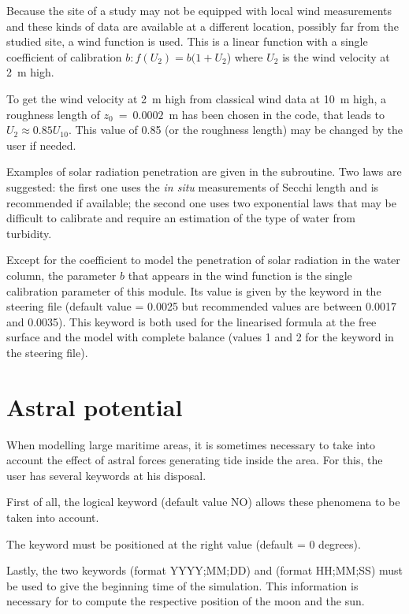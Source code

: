 Because the site of a study may not be equipped with local wind measurements
and these kinds of data are available at a different location, possibly far
from the studied site, a wind function is used. This is a linear function with
a single coefficient of calibration $b:f(U_{2}) = b(1+U_{2}$) where $U_{2}$ is
the wind velocity at 2~m high.

To get the wind velocity at 2~m high from classical wind data at 10~m high, a
roughness length of ${z}_{0}~=~0.0002$~m has been chosen in the code,
that leads to $U_{2} \approx 0.85 U_{10}$. This value
of 0.85 (or the roughness length) may be changed by the user if needed.

Examples of solar radiation penetration are given in the
 subroutine. Two laws are suggested: the first one
uses the \emph{in situ} measurements of Secchi length and is
recommended if available; the second one uses two exponential laws that may be
difficult to calibrate and require an estimation of the type of water from
turbidity.

Except for the coefficient to model the penetration of solar radiation in the
water column, the parameter $b$ that appears in the wind function is the
single calibration parameter of this module. Its value is given by the keyword
in the \waqtel steering file (default
value = 0.0025 but recommended values are between 0.0017 and 0.0035). This
keyword is both used for the linearised formula at the free surface and the
model with complete balance (values 1 and 2 for the keyword
 in the \waqtel steering file).


\section{Astral potential}

When modelling large maritime areas, it is sometimes necessary to take into
account the effect of astral forces generating tide inside the area. For this,
the user has several keywords at his disposal.

First of all, the logical keyword  (default value
NO) allows these phenomena to be taken into account.

The keyword  must be positioned at the right
value (default = 0 degrees).

Lastly, the two keywords  (format YYYY;MM;DD) and
 (format HH;MM;SS) must be used to give the
beginning time of the simulation.  This information is necessary for 
to compute the respective position of the moon and the sun.

